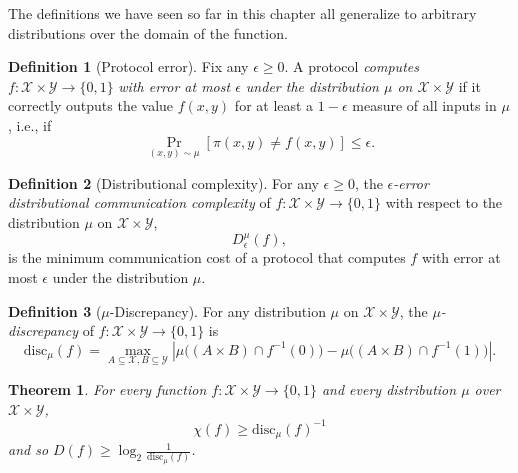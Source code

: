 \documentclass[11pt]{amsart}
\theoremstyle{plain}
\newtheorem{theorem}{Theorem}
\theoremstyle{definition}
\newtheorem{definition}{Definition}
\theoremstyle{plain}
\newcommand{\calX}{\mathcal{X}}
\newcommand{\calY}{\mathcal{Y}}
\newcommand{\disc}{\mathrm{disc}}
\begin{document}
The definitions we have seen so far in this chapter all generalize to arbitrary distributions over the domain of the function.

\begin{definition}[Protocol error]
Fix any $\epsilon \ge 0$. A protocol \emph{computes} $f : \calX \times \calY \to \{0,1\}$ \emph{with error at most $\epsilon$ under the distribution $\mu$ on $\calX \times \calY$} if it correctly outputs the value $f(x,y)$ for at least a $1-\epsilon$ measure of all inputs in $\mu$, i.e., if
\[
\Pr_{(x,y) \sim \mu}[ \pi(x,y) \neq f(x,y) ] \le \epsilon.
\]
\end{definition}

\begin{definition}[Distributional complexity]
For any $\epsilon \ge 0$, the \emph{$\epsilon$-error distributional communication complexity} of $f : \calX \times \calY \to \{0,1\}$ with respect to the distribution $\mu$ on $\calX \times \calY$,
\[
D_\epsilon^{\mu}(f),
\]
is the minimum communication cost of a protocol that computes $f$ with error at most $\epsilon$ under the distribution $\mu$.
\end{definition}

\begin{definition}[$\mu$-Discrepancy]
For any distribution $\mu$ on $\calX \times \calY$, 
the \emph{$\mu$-discrepancy} of $f : \calX \times \calY \to \{0,1\}$ is
\[
\disc_\mu(f) = \max_{A \subseteq \calX, B \subseteq \calY} 
\left| \mu\big( (A \times B) \cap f^{-1}(0) \big) - \mu\big( (A \times B) \cap f^{-1}(1)\big) \right|.
\]
\end{definition}

\begin{theorem}
For every function $f : \calX \times \calY \to \{0,1\}$ and every distribution $\mu$ over $\calX \times \calY$, 
\[
\chi(f) \ge \disc_\mu(f)^{-1}
\] 
and so $D(f) \ge \log_2 \frac1{\disc_\mu(f)}$.
\end{theorem}
\end{document}
